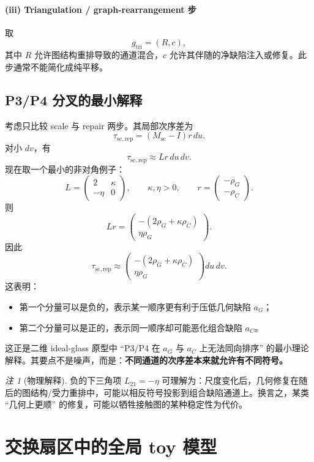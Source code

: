 \documentclass[11pt,a4paper]{ctexart}
\theoremstyle{remark}
\newtheorem{remark}[definition]{注}
\begin{document}
\paragraph{(iii) Triangulation / graph-rearrangement 步} 取
\[
g_{\mathrm{tri}}=(R,c),
\]
其中 $R$ 允许图结构重排导致的通道混合，$c$ 允许其伴随的净缺陷注入或修复。此步通常不能简化成纯平移。

\subsection{P3/P4 分叉的最小解释}

考虑只比较 scale 与 repair 两步。其局部次序差为
\[
\tau_{\mathrm{sc,rep}}=(M_{\mathrm{sc}}-I)r\,du.
\]
对小 $dv$，有
\[
\tau_{\mathrm{sc,rep}}\approx Lr\,du\,dv.
\]
现在取一个最小的非对角例子：
\[
L=
\begin{pmatrix}
2 & \kappa\\
-\eta & 0
\end{pmatrix},
\qquad
\kappa,\eta>0,
\qquad
r=
\begin{pmatrix}
-\rho_G\\ -\rho_C
\end{pmatrix}.
\]
则
\[
Lr=
\begin{pmatrix}
-(2\rho_G+\kappa\rho_C)\\
\eta\rho_G
\end{pmatrix}.
\]
因此
\[
\tau_{\mathrm{sc,rep}}
\approx
\begin{pmatrix}
-(2\rho_G+\kappa\rho_C)\\
\eta\rho_G
\end{pmatrix}du\,dv.
\]
这表明：
\begin{itemize}
    \item 第一个分量可以是负的，表示某一顺序更有利于压低几何缺陷 $a_G$；
    \item 第二个分量可以是正的，表示同一顺序却可能恶化组合缺陷 $a_C$。
\end{itemize}

这正是二维 ideal-glass 原型中 ``P3/P4 在 $a_G$ 与 $a_C$ 上无法同向排序'' 的最小理论解释。其要点不是噪声，而是：\textbf{不同通道的次序差本来就允许有不同符号。}

\begin{remark}[物理解释]
负的下三角项 $L_{21}=-\eta$ 可理解为：尺度变化后，几何修复在随后的图结构/受力重排中，可能以相反符号投影到组合缺陷通道上。换言之，某类 ``几何上更顺'' 的修复，可能以牺牲接触图的某种稳定性为代价。
\end{remark}

\section{交换扇区中的全局 toy 模型}
\end{document}
